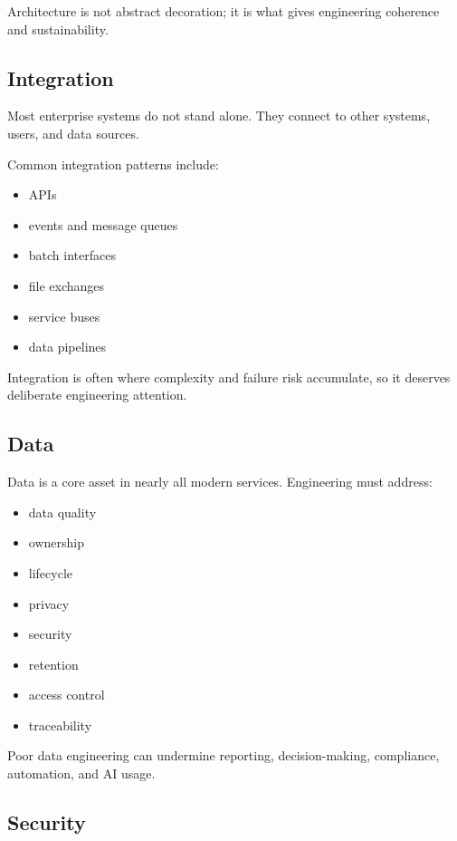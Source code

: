 \documentclass[
  british,
  letterpaper,
  DIV=11,
  numbers=noendperiod]{scrartcl}
\providecommand{\tightlist}{%
  \setlength{\itemsep}{0pt}\setlength{\parskip}{0pt}}
\begin{document}
Architecture is not abstract decoration; it is what gives engineering
coherence and sustainability.

\subsection{Integration}\label{integration}

Most enterprise systems do not stand alone. They connect to other
systems, users, and data sources.

Common integration patterns include:

\begin{itemize}
\tightlist
\item
  APIs
\item
  events and message queues
\item
  batch interfaces
\item
  file exchanges
\item
  service buses
\item
  data pipelines
\end{itemize}

Integration is often where complexity and failure risk accumulate, so it
deserves deliberate engineering attention.

\subsection{Data}\label{data}

Data is a core asset in nearly all modern services. Engineering must
address:

\begin{itemize}
\tightlist
\item
  data quality
\item
  ownership
\item
  lifecycle
\item
  privacy
\item
  security
\item
  retention
\item
  access control
\item
  traceability
\end{itemize}

Poor data engineering can undermine reporting, decision-making,
compliance, automation, and AI usage.

\subsection{Security}\label{security}
\end{document}
